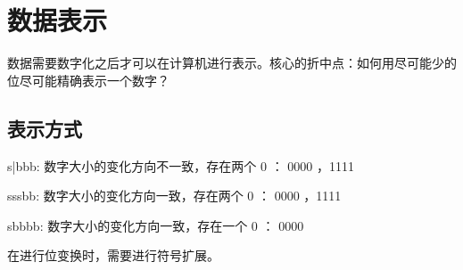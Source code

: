 \documentclass[cn,11pt,chinese,black,simple]{../elegantbook}
\begin{document}
\fi 
\def\chapname{01num}

\chapter{数据表示}

数据需要数字化之后才可以在计算机进行表示。核心的折中点：如何用尽可能少的位尽可能精确表示一个数字？

\section{表示方式}

\begin{definition}[原码]
    {s|bbb}: 数字大小的变化方向不一致，存在两个 0 ： 0000 ，1111
\end{definition}

\begin{definition}[反码]
    {sssbb}: 数字大小的变化方向一致，存在两个 0 ： 0000 ，1111
\end{definition}

\begin{definition}[补码]
    {sbbbb}: 数字大小的变化方向一致，存在一个 0 ： 0000

    在进行位变换时，需要进行符号扩展。
\end{definition}











\let\chapname\undefined
\ifx\mainclass\undefined
\end{document}
